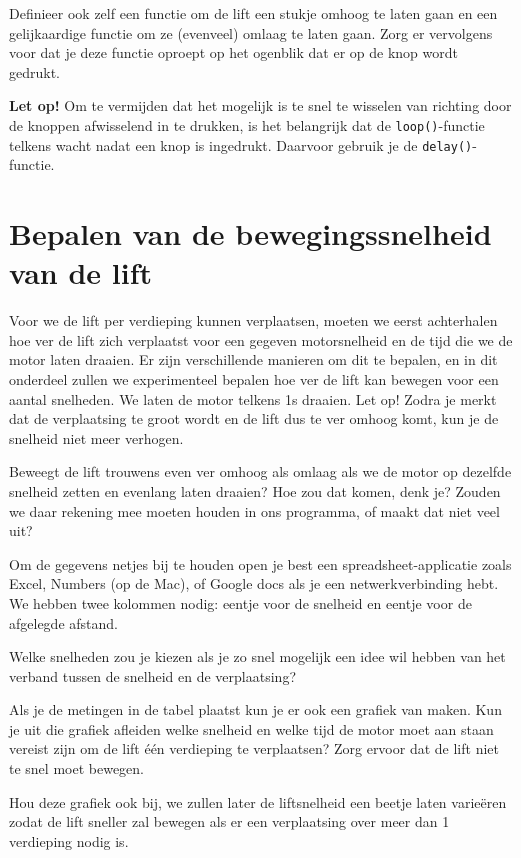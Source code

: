 \documentclass[a4paper, 10pt]{article}
\begin{document}
Definieer ook zelf een functie om de lift een stukje omhoog te laten gaan en een gelijkaardige functie om ze (evenveel)
omlaag te laten gaan. Zorg er vervolgens voor dat je deze functie oproept op het ogenblik dat er op de knop wordt
gedrukt.

\textbf{Let op!} Om te vermijden dat het mogelijk is te snel te wisselen van richting door de knoppen afwisselend in te
drukken, is het belangrijk dat de \texttt{loop()}-functie telkens wacht nadat een knop is ingedrukt. Daarvoor gebruik je
de \texttt{delay()}-functie.

\section{Bepalen van de bewegingssnelheid van de lift}

Voor we de lift per verdieping kunnen verplaatsen, moeten we eerst achterhalen hoe ver de lift zich verplaatst voor
een gegeven motorsnelheid en de tijd die we de motor laten draaien. Er zijn verschillende manieren om dit te bepalen,
en in dit onderdeel zullen we experimenteel bepalen hoe ver de lift kan bewegen voor een aantal snelheden. We laten
de motor telkens 1s draaien. Let op! Zodra je merkt dat de verplaatsing te groot wordt en de lift dus te ver omhoog
komt, kun je de snelheid niet meer verhogen.

Beweegt de lift trouwens even ver omhoog als omlaag als we de motor op
dezelfde snelheid zetten en evenlang laten draaien? Hoe zou dat komen, denk je? Zouden we daar rekening mee moeten houden
in ons programma, of maakt dat niet veel uit?

Om de gegevens netjes bij te houden open je best een spreadsheet-applicatie zoals Excel, Numbers (op de Mac), of Google
docs als je een netwerkverbinding hebt. We hebben twee kolommen nodig: eentje voor de snelheid en eentje voor de afgelegde
afstand.

Welke snelheden zou je kiezen als je zo snel mogelijk een idee wil hebben van het verband tussen de snelheid
en de verplaatsing?

Als je de metingen in de tabel plaatst kun je er ook een grafiek van maken. Kun je uit die grafiek afleiden welke
snelheid en welke tijd de motor moet aan staan  vereist zijn om de lift \'e\'en verdieping te verplaatsen?
Zorg ervoor dat de lift niet te snel moet bewegen.

Hou deze grafiek ook bij, we zullen later de liftsnelheid een beetje laten varie\"eren zodat de lift sneller zal
bewegen als er een verplaatsing over meer dan 1 verdieping nodig is.
\end{document}
